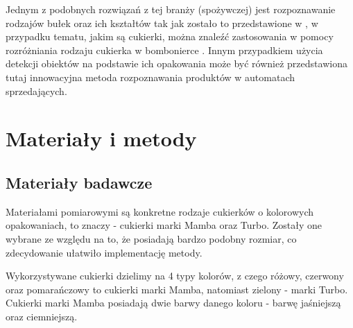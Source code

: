 \documentclass{article}
\begin{document}
Jednym z podobnych rozwiązań z tej branży (spożywczej) jest rozpoznawanie rodzajów bułek oraz ich kształtów tak jak zostało to przedstawione w \cite{virtuslab}, w przypadku tematu, jakim są cukierki, można znaleźć zastosowania w pomocy rozróżniania rodzaju cukierka w bombonierce \cite{chocolates}. Innym przypadkiem użycia detekcji obiektów na podstawie ich opakowania może być również przedstawiona tutaj \cite{vending} innowacyjna metoda rozpoznawania produktów w automatach sprzedających.

\section{Materiały i metody}
\label{Materiały i metody}
\subsection{Materiały badawcze}
\label{Materiały pomiarowe}
Materiałami pomiarowymi są konkretne rodzaje cukierków o kolorowych opakowaniach, to znaczy - cukierki marki Mamba oraz Turbo. Zostały one wybrane ze względu na to, że posiadają bardzo podobny rozmiar, co zdecydowanie ułatwiło implementację metody.

Wykorzystywane cukierki dzielimy na 4 typy kolorów, z czego różowy, czerwony oraz pomarańczowy to cukierki marki Mamba, natomiast zielony - marki Turbo. Cukierki marki Mamba posiadają dwie barwy danego koloru - barwę jaśniejszą oraz ciemniejszą.
\end{document}

